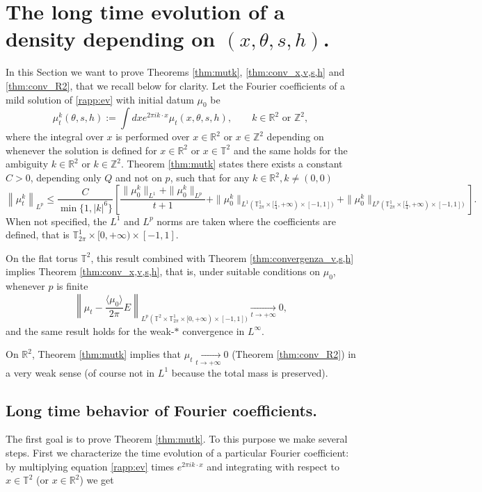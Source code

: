\documentclass[a4paper,10pt,reqno]{amsart}
\numberwithin{equation}{subsection}
\numberwithin{figure}{subsection}
\begin{document}
\section{The long time evolution of a density depending on $(x,\theta,s,h)$.}\label{xthetash}
In this Section we want to prove Theorems \ref{thm:mutk}, \ref{thm:conv_x,v,s,h} and \ref{thm:conv_R2}, that we recall below for clarity. Let the Fourier coefficients of a mild solution of \eqref{rapp:ev} with initial datum $\mu_0$ be
\[
\mu_t^k(\theta,s,h):=\int dxe^{2\pi ik\cdot x}\mu_t(x,\theta,s,h),\qquad k\in\mathbb{R}^2\textrm{ or }\mathbb{Z}^2,
\]
where the integral over $x$ is performed over $x\in\mathbb{R}^2$ or $x\in\mathbb{Z}^2$ depending on whenever the solution is defined for $x\in\mathbb{R}^2$ or $x\in\mathbb{T}^2$ and the same holds for the ambiguity $k\in\mathbb{R}^2$ or $k\in\mathbb{Z}^2$. Theorem \ref{thm:mutk} states there exists a constant $C>0$, depending only $Q$ and not on $p$, such that for any $k\in\mathbb{R}^2,k\neq(0,0)$ 
{\tiny\[
\left\|\mu_t^k\right\|_{L^p}\leq\frac{C}{\min\{1,|k|^6\}}\left[\frac{\|\mu_0^k\|_{L^1}+\|\mu_0^k\|_{L^p}}{t+1}+\|\mu_0^k\|_{L^1(\mathbb{T}^1_{2\pi}\times[\frac{t}{4},+\infty)\times[-1,1])}+\|\mu_0^k\|_{L^p(\mathbb{T}^1_{2\pi}\times[\frac{t}{4},+\infty)\times[-1,1])}\right].
\]}
When not specified, the $L^1$ and $L^p$ norms are taken where the coefficients are defined, that is $\mathbb{T}^1_{2\pi}\times[0,+\infty)\times[-1,1]$.

On the flat torus $\mathbb{T}^2$, this result combined with Theorem \ref{thm:convergenza_v,s,h} implies Theorem \ref{thm:conv_x,v,s,h}, that is, under suitable conditions on $\mu_0$, whenever $p$ is finite
\[
\left\|\mu_t-\frac{\langle\mu_0\rangle}{2\pi}E\right\|_{L^p(\mathbb{T}^2\times\mathbb{T}^1_{2\pi}\times[0,+\infty)\times[-1,1])}\xrightarrow[t\to+\infty]{}0,
\]
and the same result holds for the weak-$*$ convergence in $L^{\infty}$.

On $\mathbb{R}^2$, Theorem \ref{thm:mutk} implies that $\mu_t\xrightarrow[t\to+\infty]{}0$ (Theorem \ref{thm:conv_R2}) in a very weak sense (of course not in $L^1$ because the total mass is preserved).
\subsection{Long time behavior of Fourier coefficients.} The first goal is to prove Theorem \ref{thm:mutk}. To this purpose we make several steps. First we characterize the time evolution of a particular Fourier coefficient: by multiplying equation \eqref{rapp:ev} times $e^{2\pi ik\cdot x}$ and integrating with respect to $x\in\mathbb{T}^2$ (or $x\in\mathbb{R}^2$) we get
\end{document}
